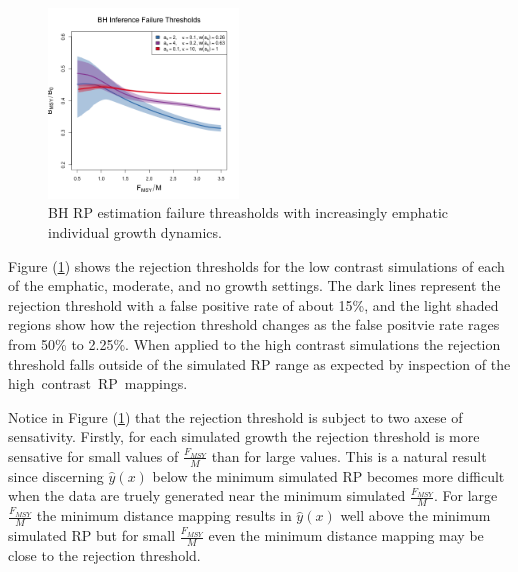 \begin{figure}
\vspace{-1.1cm}
\includegraphics[width=0.45\textwidth]{../ddBias/metaLowerZetaLinesDDFlatT45N150A0-1AS2K0.1N84Edge.png}
\vspace{-0.95cm}
\caption{BH RP estimation failure threasholds with increasingly emphatic individual growth dynamics.
}\label{breaks}
\end{figure}
%
Figure (\ref{breaks}) shows the rejection thresholds for the low contrast 
simulations of each of the emphatic, moderate, and no growth settings. %
The dark lines represent the rejection threshold with a false positive rate 
of about 15\%, and the light shaded regions show how the rejection threshold 
changes as the false positvie rate rages from 50\% to 2.25\%. 
When applied to the high contrast simulations the rejection threshold falls 
outside of the simulated RP range as expected by inspection of the 
\mbox{high contrast RP mappings.}

%
Notice in Figure (\ref{breaks}) that the rejection threshold is subject to two 
axese of sensativity. Firstly, for each simulated growth the rejection 
threshold is more sensative for small values of $\frac{F_{MSY}}{M}$ than for 
large values. This is a natural result since discerning $\hat y(x)$ below the 
minimum simulated RP becomes more difficult when the data are truely generated 
near the minimum simulated $\frac{F_{MSY}}{M}$. 
For large $\frac{F_{MSY}}{M}$ the minimum distance mapping results in $\hat y(x)$ 
well above the minimum simulated RP but for small $\frac{F_{MSY}}{M}$ even the 
minimum distance mapping may be close to the rejection threshold.

